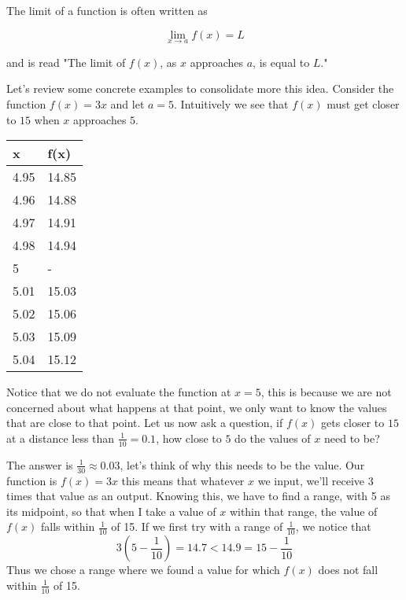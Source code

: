 \documentclass{report}
\begin{document}
The limit of a function is often written as

$$\lim_{x \to a} f(x) = L$$

and is read "The limit of $f(x)$, as $x$ approaches $a$, is equal to $L$."

Let's review some concrete examples to consolidate more this idea. Consider the function $f(x) = 3x$ and let $a = 5$. Intuitively we see that $f(x)$ must get closer to $15$ when $x$ approaches $5$.

\begin{table}[h]
    \begin{center}
        \begin{tabular}{|l|l|}
        \hline
        x    & f(x)  \\ \hline
        4.95 & 14.85 \\
        4.96 & 14.88 \\
        4.97 & 14.91 \\
        4.98 & 14.94 \\
        5    & -     \\
        5.01 & 15.03 \\
        5.02 & 15.06 \\
        5.03 & 15.09 \\
        5.04 & 15.12 \\ \hline
        \end{tabular}
    \end{center}
\end{table}

Notice that we do not evaluate the function at $x=5$, this is because we are not concerned about what happens at that point, we only want to know the values that are close to that point. Let us now ask a question, if $f(x)$ gets closer to $15$ at a distance less than $\frac{1}{10} = 0.1$, how close to $5$ do the values of $x$ need to be?

The answer is $\frac{1}{30} \approx 0.03$, let's think of why this needs to be the value. Our function is $f(x) = 3x$ this means that whatever $x$ we input, we'll receive 3 times that value as an output. Knowing this, we have to find a range, with 5 as its midpoint, so that when I take a value of $x$ within that range, the value of $f(x)$ falls within $\frac{1}{10}$ of 15. If we first try with a range of $\frac{1}{10}$, we notice that $$3\left(5 - \dfrac{1}{10}\right) = 14.7 < 14.9 = 15 - \dfrac{1}{10}$$ Thus we chose a range where we found a value for which $f(x)$ does not fall within $\frac{1}{10}$ of 15.
\end{document}
